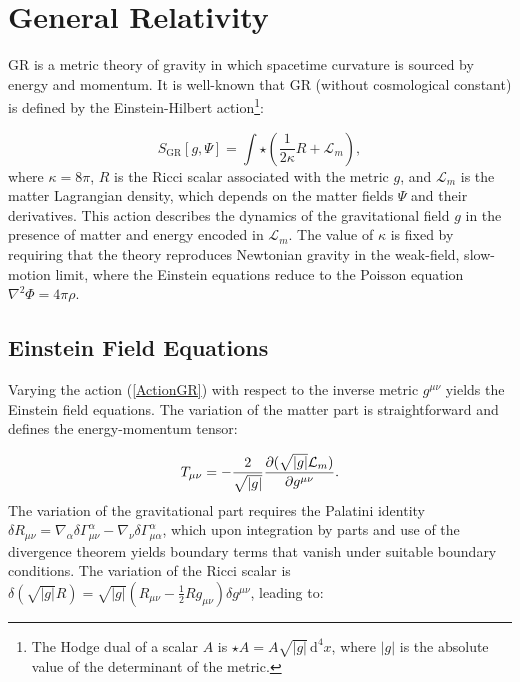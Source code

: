 \documentclass[floats,floatfix,aps, preprintnumbers,nofootinbib]{revtex4-2}
\newcommand{\paren}[1]{\left( #1 \right)}
\newcommand{\mrm}{\mathrm}
\newcommand{\mcal}{\mathcal}
\begin{document}
\section{General Relativity}
\label{sec:GR}

GR is a metric theory of gravity in which spacetime curvature is sourced by energy and momentum. It is well-known that GR (without cosmological constant) is defined by the Einstein-Hilbert action\footnote{The Hodge dual of a scalar $A$ is $\star A = A\sqrt{|g|}\,\mrm d^4x$, where $|g|$ is the absolute value of the determinant of the metric.}:

\begin{equation}\label{ActionGR}
    S_{\mrm{GR}}[g, \Psi] = \int \star \paren{\frac{1}{2\kappa}R + \mcal L_m},
\end{equation}
where $\kappa = 8\pi$, $R$ is the Ricci scalar associated with the metric $g$, and $\mcal L_m$ is the matter Lagrangian density, which depends on the matter fields $\Psi$ and their derivatives. This action describes the dynamics of the gravitational field $g$ in the presence of matter and energy encoded in $\mcal L_m$. The value of $\kappa$ is fixed by requiring that the theory reproduces Newtonian gravity in the weak-field, slow-motion limit, where the Einstein equations reduce to the Poisson equation $\nabla^2\Phi = 4\pi\rho$.

\subsection{Einstein Field Equations}

Varying the action (\ref{ActionGR}) with respect to the inverse metric $g^{\mu\nu}$ yields the Einstein field equations. The variation of the matter part is straightforward and defines the energy-momentum tensor:

\begin{equation}\label{EMTensor}
    T_{\mu\nu} = -\frac{2}{\sqrt{|g|}}\pdv{(\sqrt{|g|}\mcal L_m)}{g^{\mu\nu}}.
\end{equation}
The variation of the gravitational part requires the Palatini identity $\delta R_{\mu\nu} = \nabla_\alpha \delta\Gamma^\alpha_{\mu\nu} - \nabla_\nu \delta\Gamma^\alpha_{\mu\alpha}$, which upon integration by parts and use of the divergence theorem yields boundary terms that vanish under suitable boundary conditions. The variation of the Ricci scalar is $\delta(\sqrt{|g|}R) = \sqrt{|g|}(R_{\mu\nu} - \frac{1}{2}Rg_{\mu\nu})\delta g^{\mu\nu}$, leading to:
\end{document}
